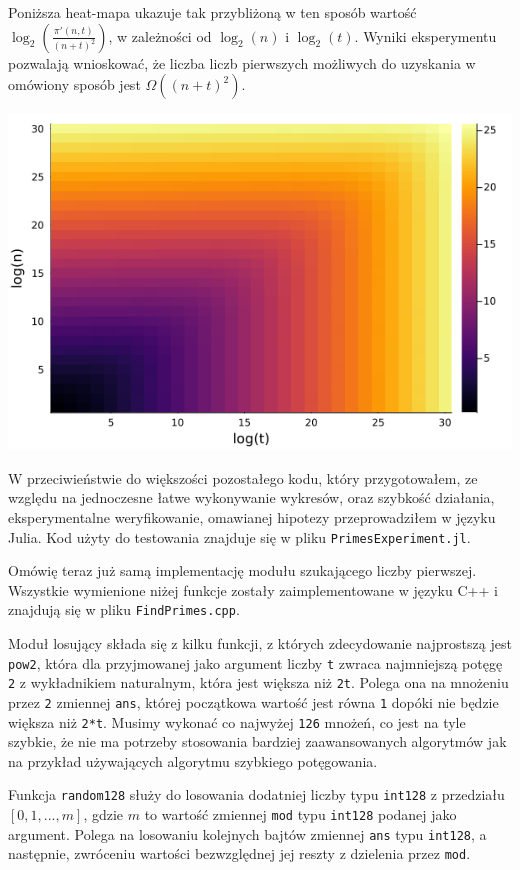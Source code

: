 \documentclass{article}
\begin{document}
Poniższa heat-mapa ukazuje tak przybliżoną w ten sposób wartość $\log_2(\frac{\pi'(n,t)}{(n+t)^2})$, w zależności od $\log_2(n)$ i $\log_2(t)$. 
Wyniki eksperymentu pozwalają wnioskować, że liczba liczb pierwszych możliwych do uzyskania w omówiony sposób
jest $\Omega((n+t)^2)$.
\begin{center}
    \includegraphics[width=\textwidth]{wykres.png}    
\end{center}


W przeciwieństwie do większości pozostałego kodu, który przygotowałem, ze względu na jednoczesne łatwe wykonywanie wykresów, oraz szybkość działania, 
eksperymentalne weryfikowanie, omawianej
hipotezy przeprowadziłem w języku Julia. Kod użyty do testowania znajduje się  w pliku \texttt{PrimesExperiment.jl}.

Omówię teraz już samą implementację modułu szukającego liczby pierwszej. Wszystkie wymienione niżej funkcje zostały  zaimplementowane w języku C++ i znajdują się w pliku \texttt{FindPrimes.cpp}.

Moduł losujący składa się z kilku funkcji, z których zdecydowanie najprostszą jest \texttt{pow2}, która dla przyjmowanej jako argument liczby \texttt{t}
zwraca najmniejszą potęgę \texttt{2} z wykładnikiem naturalnym, która jest większa niż \texttt{2t}. Polega ona na
mnożeniu przez \texttt{2} zmiennej \texttt{ans}, której początkowa wartość jest równa \texttt{1} dopóki nie będzie 
większa niż \texttt{2*t}. Musimy wykonać co najwyżej \texttt{126} mnożeń, co jest na tyle szybkie, że nie ma 
potrzeby stosowania bardziej zaawansowanych algorytmów jak na przykład 
używających algorytmu szybkiego potęgowania.


Funkcja \texttt{random128} służy do losowania dodatniej liczby typu
\texttt{\textunderscore \textunderscore int128} z przedziału $[0,1,...,m]$, gdzie $m$ to wartość zmiennej \texttt{mod}
typu \texttt{\textunderscore \textunderscore int128} podanej jako argument. 
Polega na losowaniu kolejnych bajtów zmiennej \texttt{ans} typu \texttt{\textunderscore \textunderscore int128}, a następnie,
zwróceniu wartości bezwzględnej jej reszty z dzielenia przez \texttt{mod}.
\end{document}

